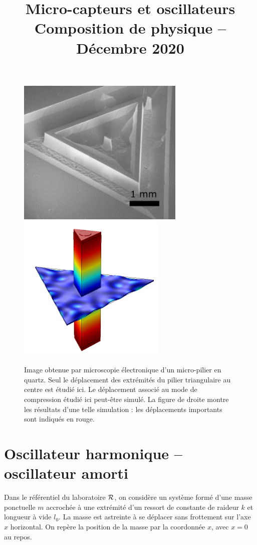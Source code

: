 \documentclass[12pt,a4paper]{exam}
\title{Micro-capteurs et oscillateurs\\ Composition de physique -- Décembre 2020}
\date{}
\begin{document}
\maketitle

\begin{figure}[b!]
\center
\includegraphics[height=200pt]{micropillar.png}
\includegraphics[height=200pt]{micropillar_disp.png}
\caption{Image obtenue par microscopie électronique d'un micro-pilier en quartz.
Seul le déplacement des extrémités du pilier triangulaire au centre est étudié ici.
Le déplacement associé au mode de compression étudié ici peut-être simulé.
La figure de droite montre les résultats d'une telle simulation : les déplacements importants sont indiqués en rouge.}
\label{fig:micro_pillar}
\end{figure}

\section{Oscillateur harmonique -- oscillateur amorti}

Dans le référentiel du laboratoire $\cal{R}$, on considère un système formé d'une masse ponctuelle $m$ accrochée à une extrémité d'un ressort de constante de raideur $k$ et longueur à vide $l_0$.
La masse est astreinte à se déplacer sans frottement sur l'axe $x$ horizontal.
On repère la position de la masse par la coordonnée $x$, avec $x=0$ au repos.
\end{document}
